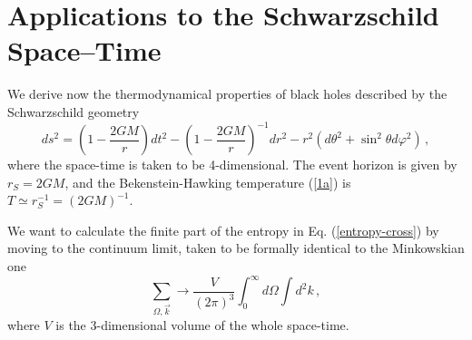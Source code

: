 \section{Applications to the Schwarzschild Space--Time}
\setcounter{equation}{0}

 We derive now the thermodynamical properties of black holes
described by the Schwarzschild geometry
 \begin{equation}
 ds^2=\left( 1-\frac{2GM}{r} \right) dt^2-
 \left( 1-\frac{2GM}{r} \right)^{-1}dr^2 -
 r^2(d\theta^2+\sin^2\theta d\varphi^2)\,,
 \label{SCHW}
 \end{equation}
where the space-time is taken to be 4-dimensional. The event
horizon is given by $r_S = 2GM$, and the Bekenstein-Hawking
temperature (\ref{1a}) is $T \simeq r^{-1}_S = (2GM)^{-1}$.

 We want to calculate the finite part of the entropy in
Eq. (\ref{entropy-cross}) by moving to the continuum limit, taken
to be formally identical to the Minkowskian one
 \begin{equation}\label{continuum}
\sum_{\Omega, \vec k} \to \frac{V}{(2\pi)^3}\int_0^\infty
d\Omega\int d^2 k\,,
 \end{equation}
where $V$ is the 3-dimensional volume of the whole space-time.

